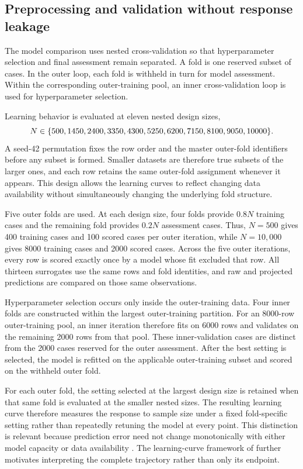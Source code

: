 \subsection{Preprocessing and validation without response leakage}

The model comparison uses nested cross-validation so that hyperparameter selection and final assessment remain separated. A fold is one reserved subset of cases. In the outer loop, each fold is withheld in turn for model assessment. Within the corresponding outer-training pool, an inner cross-validation loop is used for hyperparameter selection.

Learning behavior is evaluated at eleven nested design sizes,
\begin{equation}
\equationname{Observation counts for nested reactor assessment}
N\in\{500,1450,2400,3350,4300,5250,6200,7150,8100,9050,10000\}.
\label{eq:reactor_nested_sample_sizes}
\end{equation}
A seed-42 permutation fixes the row order and the master outer-fold identifiers before any subset is formed. Smaller datasets are therefore true subsets of the larger ones, and each row retains the same outer-fold assignment whenever it appears. This design allows the learning curves to reflect changing data availability without simultaneously changing the underlying fold structure.

Five outer folds are used. At each design size, four folds provide $0.8N$ training cases and the remaining fold provides $0.2N$ assessment cases. Thus, $N=500$ gives 400 training cases and 100 scored cases per outer iteration, while $N=10{,}000$ gives 8000 training cases and 2000 scored cases. Across the five outer iterations, every row is scored exactly once by a model whose fit excluded that row. All thirteen surrogates use the same rows and fold identities, and raw and projected predictions are compared on those same observations.

Hyperparameter selection occurs only inside the outer-training data. Four inner folds are constructed within the largest outer-training partition. For an 8000-row outer-training pool, an inner iteration therefore fits on 6000 rows and validates on the remaining 2000 rows from that pool. These inner-validation cases are distinct from the 2000 cases reserved for the outer assessment. After the best setting is selected, the model is refitted on the applicable outer-training subset and scored on the withheld outer fold.

For each outer fold, the setting selected at the largest design size is retained when that same fold is evaluated at the smaller nested sizes. The resulting learning curve therefore measures the response to sample size under a fixed fold-specific setting rather than repeatedly retuning the model at every point. This distinction is relevant because prediction error need not change monotonically with either model capacity or data availability \citep{Belkin2019}. The learning-curve framework of \citet{VieringLoog2023} further motivates interpreting the complete trajectory rather than only its endpoint.

